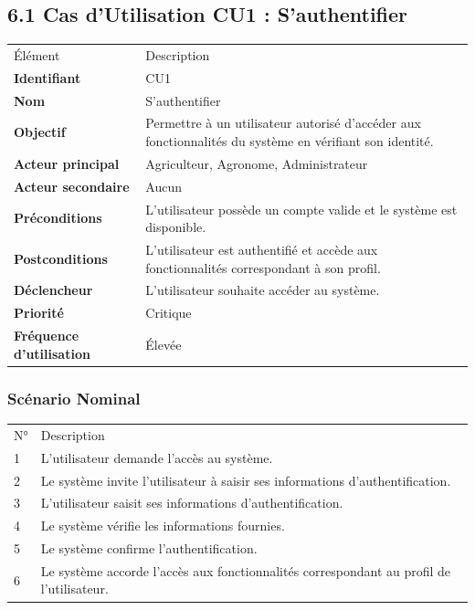 \documentclass[
]{article}
\begin{document}
\hypertarget{cas-dutilisation-cu1-sauthentifier}{%
\subsection{6.1 Cas d'Utilisation CU1 :
S'authentifier}\label{cas-dutilisation-cu1-sauthentifier}}

\begin{longtable}[]{@{}ll@{}}
\toprule
\endhead
Élément & Description \\
\textbf{Identifiant} & CU1 \\
\textbf{Nom} & S'authentifier \\
\textbf{Objectif} & Permettre à un utilisateur autorisé d'accéder aux
fonctionnalités du système en vérifiant son identité. \\
\textbf{Acteur principal} & Agriculteur, Agronome, Administrateur \\
\textbf{Acteur secondaire} & Aucun \\
\textbf{Préconditions} & L'utilisateur possède un compte valide et le
système est disponible. \\
\textbf{Postconditions} & L'utilisateur est authentifié et accède aux
fonctionnalités correspondant à son profil. \\
\textbf{Déclencheur} & L'utilisateur souhaite accéder au système. \\
\textbf{Priorité} & Critique \\
\textbf{Fréquence d'utilisation} & Élevée \\
\bottomrule
\end{longtable}

\hypertarget{scuxe9nario-nominal}{%
\subsubsection{Scénario Nominal}\label{scuxe9nario-nominal}}

\begin{longtable}[]{@{}ll@{}}
\toprule
\endhead
N° & Description \\
1 & L'utilisateur demande l'accès au système. \\
2 & Le système invite l'utilisateur à saisir ses informations
d'authentification. \\
3 & L'utilisateur saisit ses informations d'authentification. \\
4 & Le système vérifie les informations fournies. \\
5 & Le système confirme l'authentification. \\
6 & Le système accorde l'accès aux fonctionnalités correspondant au
profil de l'utilisateur. \\
\bottomrule
\end{longtable}
\end{document}

